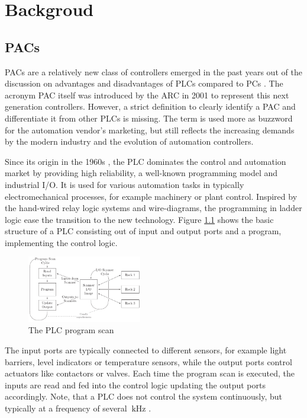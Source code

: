 \chapter{Backgroud}
\section{\aclp{PAC}}
\aclp{PAC} are a relatively new class of controllers emerged in the past years
out of the discussion on advantages and disadvantages of \acp{PLC} compared to
\acp{PC} \citep{bel05}. The acronym \ac{PAC} itself was introduced by the
\ac{ARC} in 2001 \citep{pay13} to represent this next generation controllers.
However, a strict definition to clearly identify a \ac{PAC} and differentiate
it from other \acp{PLC} is missing. The term is used more as buzzword for the
automation vendor's marketing, but still reflects the increasing demands by
the modern industry and the evolution of automation controllers. 

Since its origin in the 1960s \citep{par99}, the \ac{PLC} dominates the
control and automation market by providing high reliability, a well-known
programming model and industrial I/O. It is used for various automation tasks
in typically electromechanical processes, for example machinery or plant
control. Inspired by the hand-wired relay logic systems and wire-diagrams, the
programming in ladder logic ease the transition to the new technology. Figure
\ref{fig:plc} shows the basic structure of a \ac{PLC} consisting out of input
and output ports and a program, implementing the control logic.
\begin{figure}
	\centering
	\includegraphics[width=5cm]{../figures/plc}
	\caption{The \acs{PLC} program scan \citep[adapted from][]{par99}}
	\label{fig:plc}
\end{figure}
The input ports are typically connected to different sensors, for example
light barriers, level indicators or temperature sensors, while the output
ports control actuators like contactors or valves. Each time the program scan
is executed, the inputs are read and fed into the control logic updating the
output ports accordingly. Note, that a \ac{PLC} does not control the system
continuously, but typically at a frequency of several $\SI{}{\kilo\hertz}$
\citep{par99}.

